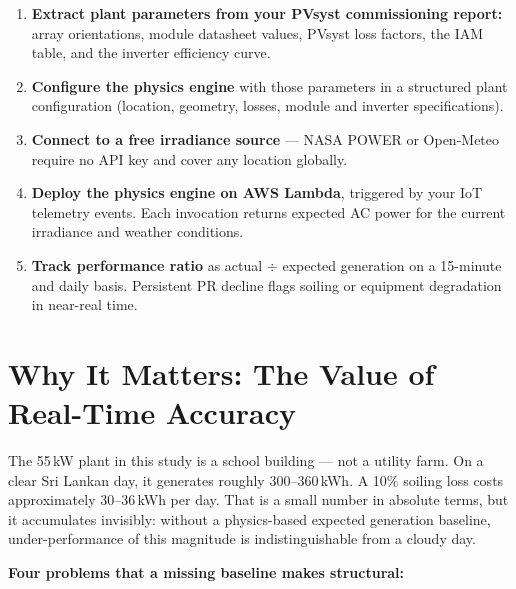 \documentclass[11pt, a4paper]{article}
\begin{document}
\begin{enumerate}
  \item \textbf{Extract plant parameters from your PVsyst commissioning report:}
    array orientations, module datasheet values, PVsyst loss factors, the IAM
    table, and the inverter efficiency curve.
  \item \textbf{Configure the physics engine} with those parameters in a
    structured plant configuration (location, geometry, losses, module and
    inverter specifications).
  \item \textbf{Connect to a free irradiance source} --- NASA POWER or
    Open-Meteo require no API key and cover any location globally.
  \item \textbf{Deploy the physics engine on AWS Lambda}, triggered by your
    IoT telemetry events. Each invocation returns expected AC power for the
    current irradiance and weather conditions.
  \item \textbf{Track performance ratio} as actual $\div$ expected generation
    on a 15-minute and daily basis. Persistent PR decline flags soiling or
    equipment degradation in near-real time.
\end{enumerate}

\section{Why It Matters: The Value of Real-Time Accuracy}

The 55\,kW plant in this study is a school building --- not a utility farm.
On a clear Sri Lankan day, it generates roughly 300--360\,kWh. A 10\%
soiling loss costs approximately 30--36\,kWh per day. That is a small number
in absolute terms, but it accumulates invisibly: without a physics-based
expected generation baseline, under-performance of this magnitude is
indistinguishable from a cloudy day.

\textbf{Four problems that a missing baseline makes structural:}
\end{document}

